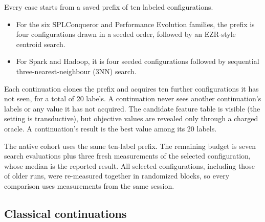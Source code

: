 Every case starts from a saved prefix of ten labeled configurations.
\begin{itemize}
  \item For the six SPLConqueror and Performance Evolution families, the prefix is four configurations drawn in a seeded order, followed by an EZR-style centroid search.
  \item For Spark and Hadoop, it is four seeded configurations followed by sequential three-nearest-neighbour (3NN) search.
\end{itemize}
Each continuation clones the prefix and acquires ten further configurations it has not seen, for a total of 20 labels. A continuation never sees another continuation's labels or any value it has not acquired. The candidate feature table is visible (the setting is transductive), but objective values are revealed only through a charged oracle. A continuation's result is the best value among its 20 labels.

The native cohort uses the same ten-label prefix. The remaining budget is seven search evaluations plus three fresh measurements of the selected configuration, whose median is the reported result. All selected configurations, including those of older runs, were re-measured together in randomized blocks, so every comparison uses measurements from the same session.

\subsection{Classical continuations}

